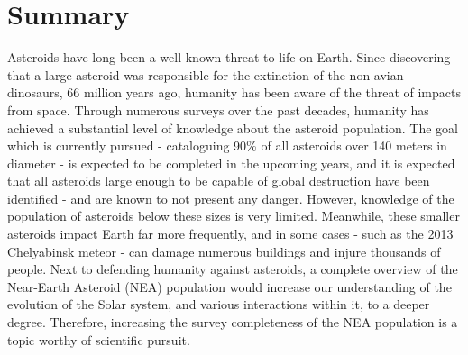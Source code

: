 \chapter{Summary}

Asteroids have long been a well-known threat to life on Earth. Since discovering that a large asteroid was responsible for the extinction of the non-avian dinosaurs, 66 million years ago, humanity has been aware of the threat of impacts from space. Through numerous surveys over the past decades, humanity has achieved a substantial level of knowledge about the asteroid population. The goal which is currently pursued - cataloguing 90\% of all asteroids over 140 meters in diameter - is expected to be completed in the upcoming years, and it is expected that all asteroids large enough to be capable of global destruction have been identified - and are known to not present any danger. However, knowledge of the population of asteroids below these sizes is very limited. Meanwhile, these smaller asteroids impact Earth far more frequently, and in some cases - such as the 2013 Chelyabinsk meteor - can damage numerous buildings and injure thousands of people. Next to defending humanity against asteroids, a complete overview of the Near-Earth Asteroid (NEA) population would increase our understanding of the evolution of the Solar system, and various interactions within it, to a deeper degree. Therefore, increasing the survey completeness of the NEA population is a topic worthy of scientific pursuit. \\

